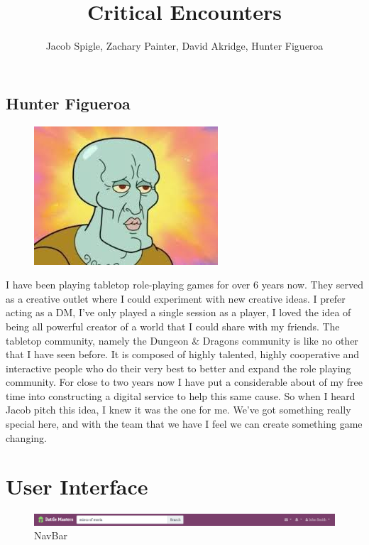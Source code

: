 \documentclass[12pt,a4paper]{report}
\author{Jacob Spigle, Zachary Painter, David Akridge, Hunter Figueroa}
\title{Critical Encounters}
\begin{document}
	
	\newpage
	\section{Hunter Figueroa}
	\begin{figure}
		\includegraphics[scale=0.05]{Hunter_Figueroa}
	\end{figure}
	I have been playing tabletop role-playing games for over 6 years now. They served as a creative outlet where I could experiment with new creative ideas. I prefer acting as a DM, I’ve only played a single session as a player, I loved the idea of being all powerful creator of a world that I could share with my friends. The tabletop community, namely the Dungeon \& Dragons community is like no other that I have seen before. It is composed of highly talented, highly cooperative  and interactive people who do their very best to better and expand the role playing community. For close to two years now I have put a considerable about of my free time into constructing a digital service to help this same cause. So when I heard Jacob pitch this idea, I knew it was the one for me. We’ve got something really special here, and with the team that we have I feel we can create something game changing.
	
	\newpage
	\chapter*{User Interface}

	\begin{figure}[H]
		\centering
		\centerline{\includegraphics[scale=.30]{navbar}}
		\caption{NavBar}
		\label{fig: NavBar}
	\end{figure}
\end{document}
